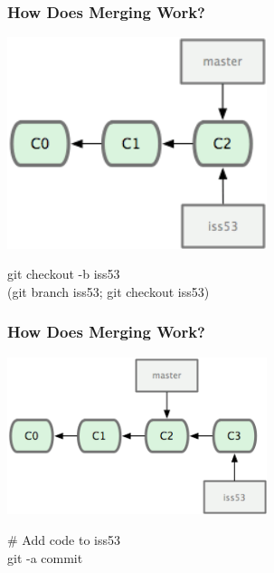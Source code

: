 \begin{frame}
\frametitle{\large How Does Merging Work?}
\begin{center}
\includegraphics[width=0.57\textwidth]{img/branching_images/f2.png}
\end{center}
\vspace{1mm}
\begin{center}
\small git checkout -b iss53 \\
\small (git branch iss53; git checkout iss53)
\end{center}
\end{frame}
\note{}

\begin{frame}
\frametitle{\large How Does Merging Work?}
\begin{center}
\includegraphics[width=0.57\textwidth]{img/branching_images/f3.png}
\end{center}
\vspace{2mm}
\begin{center}
\# Add code to iss53\\
git -a commit
\end{center}
\end{frame}
\note{}

